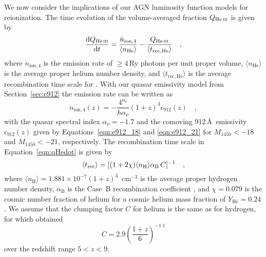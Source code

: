 \documentclass[fleqn,usenatbib]{mnras}
\begin{document}
We now consider the implications of our AGN luminosity function models
for  reionization. The time evolution of the
volume-averaged  fraction $Q_\ion{He}{iii}$ is given by
\citep[e.g.][]{2012ApJ...746..125H}
\begin{equation}
  \frac{\mathrm{d}Q_\ion{He}{iii}}{\mathrm{d}t}=\frac{\dot{n}_\mathrm{ion,4}}{\langle n_\mathrm{He}\rangle}-\frac{Q_\ion{He}{iii}}{\langle t_\mathrm{rec,He}\rangle}\quad,
  \label{eqn:qHedot}
\end{equation}
where $\dot n_\mathrm{ion,4}$ is the emission rate of $\ge 4$\,Ry
photons per unit proper volume, $\langle n_\mathrm{He}\rangle$ is the
average proper helium number density, and $\langle
t_\mathrm{rec,He}\rangle$ is the average recombination time scale for
.  With our quasar emissivity model from
Section~\ref{sec:e912} the emission rate can be written as
\begin{equation}
\dot
n_\mathrm{ion,4}\left(z\right)=-\frac{4^{\alpha_\nu}}{h\alpha_\nu}\left(1+z\right)^3\epsilon_{912}\left(z\right)\quad,
\end{equation}
with the quasar spectral index $\alpha_\nu=-1.7$ and the comoving 912\,\AA\ emissivity
$\epsilon_{912}\left(z\right)$ given by Equations~\eqref{eqn:e912_18} and \eqref{eqn:e912_21}
for $M_{1450}<-18$ and $M_{1450}<-21$, respectively.
The recombination time scale in Equation~\eqref{eqn:qHedot} is given by
\begin{equation}
  \langle t_{\rm rec}\rangle=[(1+2\chi) \langle n_\mathrm{H}\rangle \alpha_\mathrm{B}\,C]^{-1}\quad,
  \label{eq:trec}
\end{equation}
where $\langle n_\mathrm{H}\rangle=1.881\times
10^{-7}(1+z)^3$~cm$^{-3}$ is the average proper hydrogen number
density, $\alpha_\mathrm{B}$ is the Case~B  recombination
coefficient \citep{1997MNRAS.292...27H}, and $\chi=0.079$ is the
cosmic number fraction of helium for a cosmic helium mass fraction of
$Y_\mathrm{He}=0.24$.  We assume that the clumping factor $C$ for
helium is the same as for hydrogen, for which
\citet{2012ApJ...747..100S} obtained
\begin{equation}
  C = 2.9\left(\frac{1+z}{6}\right)^{-1.1}
\end{equation}
over the redshift range $5<z<9$. 
\end{document}
